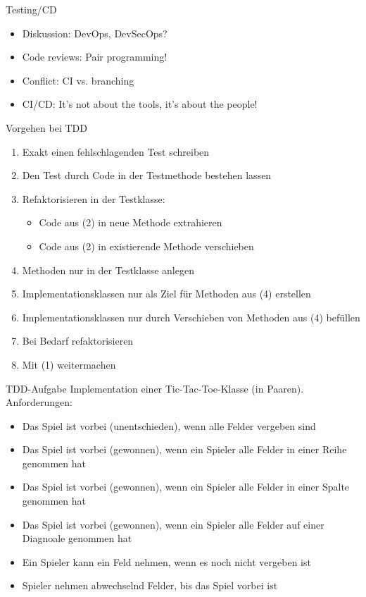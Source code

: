 \begin{frame}[allowframebreaks]{Testing/CD}
	\begin{itemize}
		\item Diskussion: DevOps, DevSecOps?
		\item Code reviews: Pair programming!
		\item Conflict: CI vs. branching
		\item CI/CD: It's not about the tools, it's about the people!
	\end{itemize}
\end{frame}

\begin{frame}{Vorgehen bei TDD}
	\begin{enumerate}
		\item Exakt einen fehlschlagenden Test schreiben
		\item Den Test durch Code in der Testmethode bestehen lassen
		\item Refaktorisieren in der Testklasse:
		\begin{itemize}
			\item Code aus (2) in neue Methode extrahieren
			\item Code aus (2) in existierende Methode verschieben
		\end{itemize}
		\item Methoden nur in der Testklasse anlegen
		\item Implementationsklassen nur als Ziel für Methoden aus (4) erstellen
		\item Implementationsklassen nur durch Verschieben von Methoden aus (4) befüllen
		\item Bei Bedarf refaktorisieren
		\item Mit (1) weitermachen
	\end{enumerate}
\end{frame}

\begin{frame}{TDD-Aufgabe}
	Implementation einer Tic-Tac-Toe-Klasse (in Paaren). Anforderungen:
	\begin{itemize}
		\item Das Spiel ist vorbei (unentschieden), wenn alle Felder vergeben sind
		\item Das Spiel ist vorbei (gewonnen), wenn ein Spieler alle Felder in einer Reihe genommen hat
		\item Das Spiel ist vorbei (gewonnen), wenn ein Spieler alle Felder in einer Spalte genommen hat
		\item Das Spiel ist vorbei (gewonnen), wenn ein Spieler alle Felder auf einer Diagnoale genommen hat
		\item Ein Spieler kann ein Feld nehmen, wenn es noch nicht vergeben ist
		\item Spieler nehmen abwechselnd Felder, bis das Spiel vorbei ist
	\end{itemize}
\end{frame}
